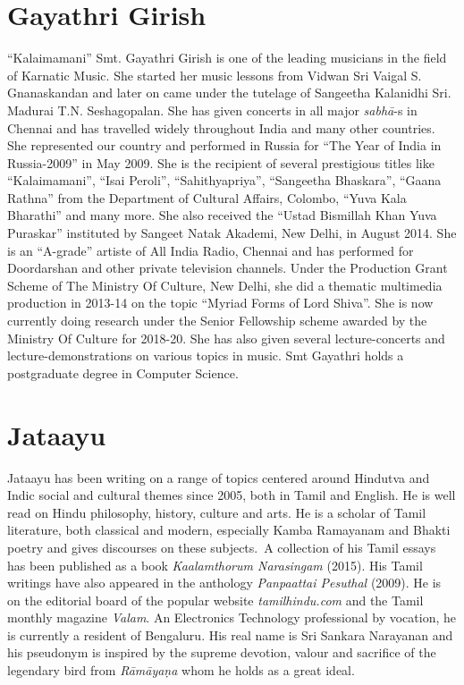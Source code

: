 \section*{Gayathri Girish}

“Kalaimamani” Smt. Gayathri Girish is one of the leading musicians in the field of Karnatic Music. She started her music lessons from Vidwan Sri Vaigal S. Gnanaskandan and later on came under the tutelage of Sangeetha Kalanidhi Sri. Madurai T.N. Seshagopalan. She has given concerts in all major \textit{sabhā}-s in Chennai and has travelled widely throughout India and many other countries. She represented our country and performed in Russia for “The Year of India in Russia-2009” in May 2009. She is the recipient of several prestigious titles like “Kalaimamani”, “Isai Peroli”, “Sahithyapriya”, “Sangeetha Bhaskara”, “Gaana Rathna” from the Department of Cultural Affairs, Colombo, “Yuva Kala Bharathi” and many more. She also received the “Ustad Bismillah Khan Yuva Puraskar” instituted by Sangeet Natak Akademi, New Delhi, in August 2014. She is an “A-grade” artiste of All India Radio, Chennai and has performed for Doordarshan and other private television channels. Under the Production Grant Scheme of The Ministry Of Culture, New Delhi, she did a thematic multimedia production in 2013-14 on the topic “Myriad Forms of Lord Shiva”. She is now currently doing research under the Senior Fellowship scheme awarded by the Ministry Of Culture for 2018-20. She has also given several lecture-concerts and lecture-demonstrations on various topics in music. Smt Gayathri holds a postgraduate degree in Computer Science.

\vspace{-.3cm}

\section*{Jataayu}

\vspace{-.2cm}

Jataayu has been writing on a range of topics centered around Hindutva and Indic social and cultural themes since 2005, both in Tamil and English. He is well read on Hindu philosophy, history, culture and arts. He is a scholar of Tamil literature, both classical and modern, especially Kamba Ramayanam and Bhakti poetry and gives discourses on these subjects.~A collection of his Tamil essays has been published as a book \textit{Kaalamthorum Narasingam} (2015). His Tamil writings have also appeared in the anthology \textit{Panpaattai Pesuthal} (2009). He is on the editorial board of the popular website \textit{tamilhindu.com} and the Tamil monthly magazine \textit{Valam}. An Electronics Technology professional by vocation, he is currently a resident of Bengaluru. His real name is Sri Sankara Narayanan and his pseudonym is inspired by the supreme devotion, valour and sacrifice of the legendary bird from \textit{Rāmāyaṇa} whom he holds as a great ideal.

